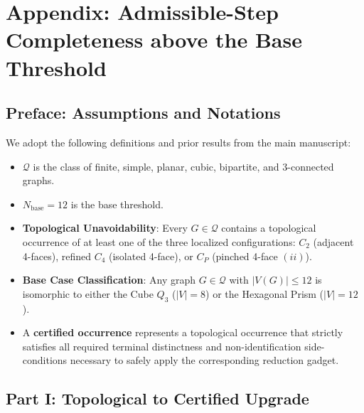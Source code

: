 \documentclass[12pt]{article}
\begin{document}
\section*{Appendix: Admissible-Step Completeness above the Base Threshold}

\subsection*{Preface: Assumptions and Notations}
We adopt the following definitions and prior results from the main manuscript:
\begin{itemize}
    \item $\mathcal{Q}$ is the class of finite, simple, planar, cubic, bipartite, and 3-connected graphs.
    \item $N_{\mathrm{base}} = 12$ is the base threshold.
    \item \textbf{Topological Unavoidability}: Every $G \in \mathcal{Q}$ contains a topological occurrence of at least one of the three localized configurations: $C_2$ (adjacent 4-faces), refined $C_4$ (isolated 4-face), or $C_P$ (pinched 4-face $(ii)$).
    \item \textbf{Base Case Classification}: Any graph $G \in \mathcal{Q}$ with $|V(G)| \le 12$ is isomorphic to either the Cube $Q_3$ ($|V|=8$) or the Hexagonal Prism ($|V|=12$). 
    \item A \textbf{certified occurrence} represents a topological occurrence that strictly satisfies all required terminal distinctness and non-identification side-conditions necessary to safely apply the corresponding reduction gadget.
\end{itemize}

\subsection*{Part I: Topological to Certified Upgrade}
\end{document}
